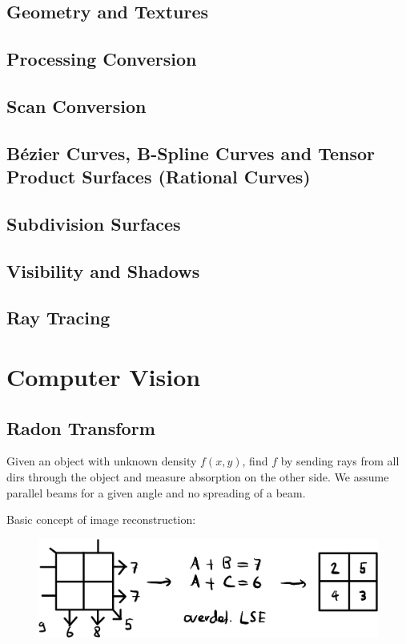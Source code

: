 \documentclass[a4paper,10pt]{article}
\begin{document}
\subsection{Geometry and Textures}
\subsection{Processing Conversion}
\subsection{Scan Conversion}
\subsection{Bézier Curves, B-Spline Curves and Tensor Product Surfaces (Rational Curves)}
\subsection{Subdivision Surfaces}
\subsection{Visibility and Shadows}
\subsection{Ray Tracing}


\pagebreak
\section{Computer Vision}
\subsection{Radon Transform}
Given an object with unknown density \( f(x,y) \), find \( f \) by sending rays from all dirs through the object and measure absorption on the other side. We assume parallel beams for a given angle and no spreading of a beam.

Basic concept of image reconstruction:
\begin{figure}[H]
    \center
    \includegraphics[width=0.75\linewidth]{radon-image-reconstruction.jpeg}
\end{figure}
\end{document}
